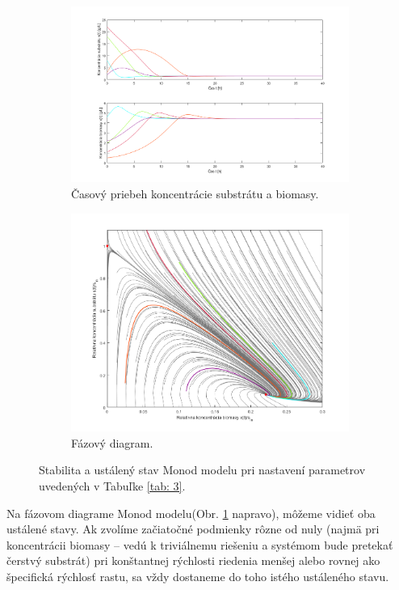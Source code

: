 \begin{figure}
	\begin{subfigure}{.5\textwidth}
		\centering
		\includegraphics[width=1\linewidth]{images/init_cond_Monod}
		\caption[]{Časový priebeh koncentrácie substrátu a biomasy.}
	\end{subfigure}
	\begin{subfigure}{.5\textwidth}
		\centering
		\includegraphics[width=1\linewidth]{images/phase_Monod}
		\caption[]{Fázový diagram.}
	\end{subfigure}
	\caption{Stabilita a ustálený stav Monod modelu pri nastavení parametrov uvedených v Tabuľke \ref{tab: 3}.}
	\label{fig:4}
\end{figure}

Na  fázovom diagrame Monod modelu(Obr. \ref{fig:4} napravo), môžeme vidieť oba ustálené stavy. Ak zvolíme začiatočné podmienky rôzne od nuly (najmä pri koncentrácii biomasy -- vedú k triviálnemu riešeniu a systémom bude pretekať čerstvý substrát) pri konštantnej rýchlosti riedenia menšej alebo rovnej ako špecifická rýchlosť rastu, sa vždy dostaneme do toho istého ustáleného stavu.

